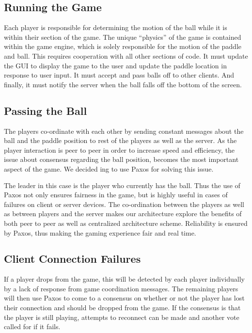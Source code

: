 \documentclass{sig-alternate}
\begin{document}
\subsection{Running the Game}

Each player is responsible for determining the motion of the ball while it
is within their section of the game.  The unique “physics” of the game is
contained within the game engine, which is solely responsible for the
motion of the paddle and ball.  This requires cooperation with all other
sections of code.  It must update the GUI to display the game to the user
and update the paddle location in response to user input.  It must accept
and pass balls off to other clients.  And finally, it must notify the
server when the ball falls off the bottom of the screen.  

\subsection{Passing the Ball}

The players co-ordinate with each other by sending constant messages about
the ball and the paddle position to rest of the players as well as the
server. As the player interaction is peer to peer in order to increase
speed and efficiency, the issue about consensus regarding the ball
position, becomes the most important aspect of the game. We decided ing to
use Paxos\cite{lamport:paxos} for solving this issue.

The leader in this case is the player who currently has the ball. Thus the
use of Paxos not only ensures fairness in the game, but is highly useful in
cases of failures on client or server devices. The co-ordination between
the players as well as between players and the server makes our
architecture explore the benefits of both peer to peer as well as
centralized architecture scheme.  Reliability is ensured by Paxos, thus
making the gaming experience fair and real time.

\subsection{Client Connection Failures}

If a player drops from the game, this will be detected by each player
individually by a lack of response from game coordination messages. The
remaining players will then use Paxos to come to a consensus on whether or
not the player has lost their connection and should be dropped from the
game.  If the consensus is that the player is still playing, attempts to
reconnect can be made and another vote called for if it fails.
\end{document}
